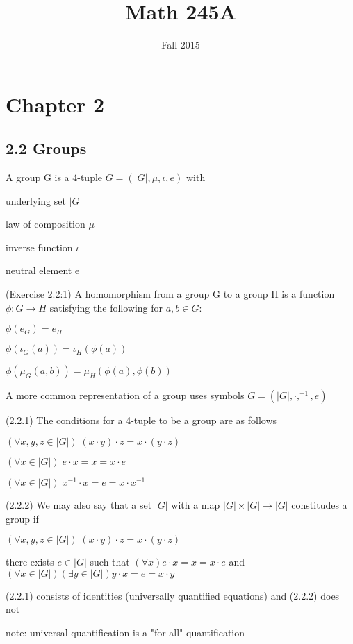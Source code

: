 \documentclass[12pt]{article}
\title{Math 245A}
\date{\normalsize Fall 2015}
\begin{document}
\maketitle

\section{Chapter 2}

\subsection{2.2 Groups}

A group G is a 4-tuple $G = (|G|, \mu, \iota, e)$ with

underlying set $|G|$

law of composition $\mu$

inverse function $\iota$

neutral element e

\noindent
(Exercise 2.2:1) A homomorphism from a group G to a group H is a function $\phi : G \to H$ satisfying the following for $a, b \in G$:

$\phi(e_G) = e_H$

$\phi(\iota_G(a)) = \iota_H(\phi(a))$

$\phi(\mu_G(a, b)) = \mu_H(\phi(a), \phi(b))$

\noindent
A more common representation of a group uses symbols $G = (|G|, \cdot, ^{-1}, e)$

\noindent
(2.2.1) The conditions for a 4-tuple to be a group are as follows

$(\forall x, y , z \in |G|)\;(x \cdot y) \cdot z =  x \cdot (y \cdot z)$

$(\forall x \in |G|)\;e \cdot x = x = x \cdot e$

$(\forall x \in |G|)\;x^{-1} \cdot x = e = x \cdot x^{-1}$

\noindent
(2.2.2) We may also say that a set $|G|$ with a map $|G| \times |G| \to |G|$ constitudes a group if

$(\forall x, y , z \in |G|)\;(x \cdot y) \cdot z =  x \cdot (y \cdot z)$

there exists $e \in |G|$ such that $(\forall x) e \cdot x = x = x \cdot e$ and $(\forall x \in |G|)(\exists y \in |G|) y \cdot x = e = x \cdot y$

\noindent
(2.2.1) consists of identities (universally quantified equations) and (2.2.2) does not

note: universal quantification is a "for all" quantification
\end{document}

